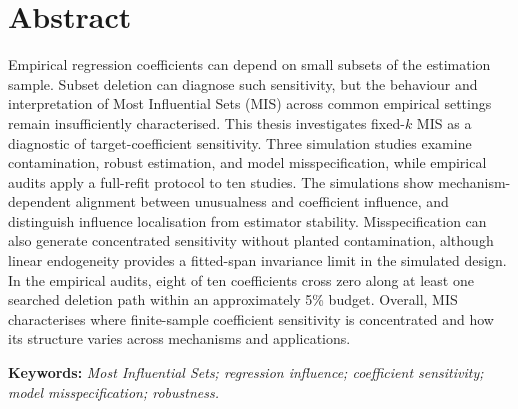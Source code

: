 \documentclass[../main.tex]{subfiles}
\begin{document}
	
\section*{Abstract}
	
Empirical regression coefficients can depend on small subsets of the estimation sample. Subset deletion can diagnose such sensitivity, but the behaviour and interpretation of Most Influential Sets (MIS) across common empirical settings remain insufficiently characterised. This thesis investigates fixed-\(k\) MIS as a diagnostic of target-coefficient sensitivity. Three simulation studies examine contamination, robust estimation, and model misspecification, while empirical audits apply a full-refit protocol to ten studies. The simulations show mechanism-dependent alignment between unusualness and coefficient influence, and distinguish influence localisation from estimator stability. Misspecification can also generate concentrated sensitivity without planted contamination, although linear endogeneity provides a fitted-span invariance limit in the simulated design. In the empirical audits, eight of ten coefficients cross zero along at least one searched deletion path within an approximately 5\% budget. Overall, MIS characterises where finite-sample coefficient sensitivity is concentrated and how its structure varies across mechanisms and applications.
	
\vspace{1em}
	
\noindent
\textbf{Keywords:}
\textit{Most Influential Sets; regression influence; coefficient sensitivity; model misspecification; robustness.}
	
\end{document}
